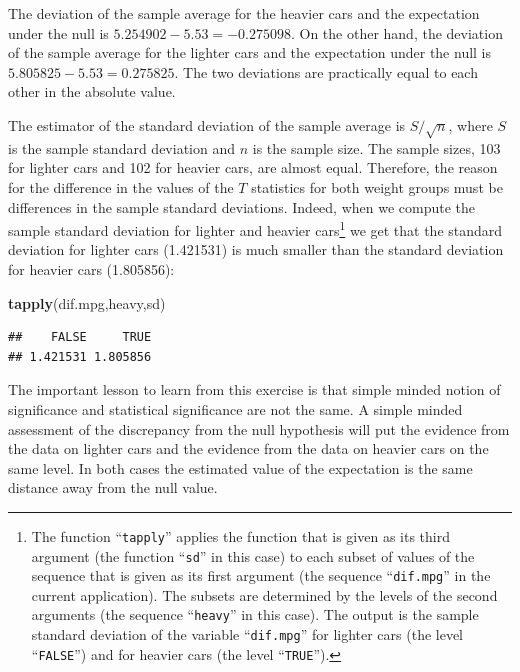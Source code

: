 \documentclass[
]{krantz}
\makeatletter
\newenvironment{Shaded}{\begin{snugshade}}{\end{snugshade}}
\newcommand{\KeywordTok}[1]{\textcolor[rgb]{0.13,0.29,0.53}{\textbf{#1}}}
\newcommand{\NormalTok}[1]{#1}
\newenvironment{kframe}{%
\medskip{}
\setlength{\fboxsep}{.8em}
 \def\at@end@of@kframe{}%
 \ifinner\ifhmode%
  \def\at@end@of@kframe{\end{minipage}}%
  \begin{minipage}{\columnwidth}%
 \fi\fi%
 \def\FrameCommand##1{\hskip\@totalleftmargin \hskip-\fboxsep
 \colorbox{shadecolor}{##1}\hskip-\fboxsep
     \hskip-\linewidth \hskip-\@totalleftmargin \hskip\columnwidth}%
 \MakeFramed {\advance\hsize-\width
   \@totalleftmargin\z@ \linewidth\hsize
   \@setminipage}}%
 {\par\unskip\endMakeFramed%
 \at@end@of@kframe}
\renewenvironment{Shaded}{\begin{kframe}}{\end{kframe}}
\theoremstyle{definition}
\theoremstyle{definition}
\theoremstyle{definition}
\theoremstyle{remark}
\makeatother
\begin{document}
The deviation of the sample average for the heavier cars and the
expectation under the null is \(5.254902 - 5.53 = -0.275098\). On the
other hand, the deviation of the sample average for the lighter cars and
the expectation under the null is \(5.805825 - 5.53 = 0.275825\). The two
deviations are practically equal to each other in the absolute value.

The estimator of the standard deviation of the sample average is
\(S/\sqrt{n}\), where \(S\) is the sample standard deviation and \(n\) is the
sample size. The sample sizes, 103 for lighter cars and 102 for heavier
cars, are almost equal. Therefore, the reason for the difference in the
values of the \(T\) statistics for both weight groups must be differences
in the sample standard deviations. Indeed, when we compute the sample
standard deviation for lighter and heavier cars\footnote{The function ``\texttt{tapply}'' applies the function that is given as its
  third argument (the function ``\texttt{sd}'' in this case) to each subset of
  values of the sequence that is given as its first argument (the
  sequence ``\texttt{dif.mpg}'' in the current application). The subsets are
  determined by the levels of the second arguments (the sequence
  ``\texttt{heavy}'' in this case). The output is the sample standard deviation
  of the variable ``\texttt{dif.mpg}'' for lighter cars (the level ``\texttt{FALSE}'')
  and for heavier cars (the level ``\texttt{TRUE}'').} we get that the
standard deviation for lighter cars (1.421531) is much smaller than the
standard deviation for heavier cars (1.805856):

\begin{Shaded}
\begin{Highlighting}[]
\KeywordTok{tapply}\NormalTok{(dif.mpg,heavy,sd)}
\end{Highlighting}
\end{Shaded}

\begin{verbatim}
##    FALSE     TRUE 
## 1.421531 1.805856
\end{verbatim}

The important lesson to learn from this exercise is that simple minded
notion of significance and statistical significance are not the same. A
simple minded assessment of the discrepancy from the null hypothesis
will put the evidence from the data on lighter cars and the evidence
from the data on heavier cars on the same level. In both cases the
estimated value of the expectation is the same distance away from the
null value.
\end{document}

